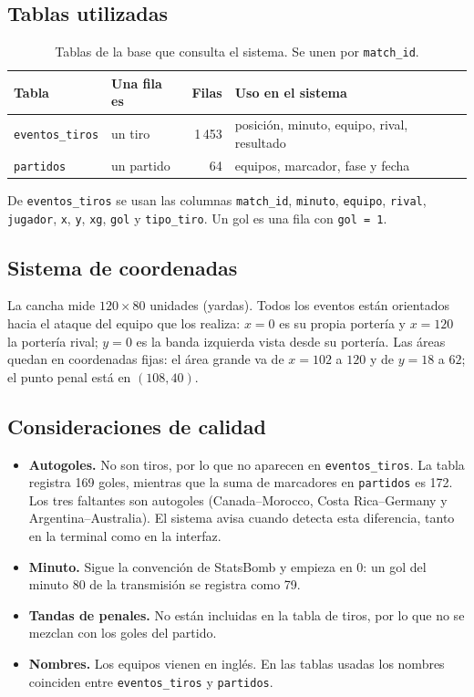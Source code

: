 \documentclass[11pt,a4paper]{article}
\begin{document}
\subsection{Tablas utilizadas}

\begin{table}[H]
\centering
\begin{tabular}{@{}llrl@{}}
\toprule
Tabla & Una fila es & Filas & Uso en el sistema \\
\midrule
\texttt{eventos\_tiros} & un tiro & 1\,453 & posición, minuto, equipo, rival, resultado \\
\texttt{partidos}       & un partido & 64 & equipos, marcador, fase y fecha \\
\bottomrule
\end{tabular}
\caption{Tablas de la base que consulta el sistema. Se unen por \texttt{match\_id}.}
\end{table}

De \texttt{eventos\_tiros} se usan las columnas \texttt{match\_id}, \texttt{minuto},
\texttt{equipo}, \texttt{rival}, \texttt{jugador}, \texttt{x}, \texttt{y}, \texttt{xg},
\texttt{gol} y \texttt{tipo\_tiro}. Un gol es una fila con \texttt{gol = 1}.

\subsection{Sistema de coordenadas}

La cancha mide $120 \times 80$ unidades (yardas). Todos los eventos están orientados
hacia el ataque del equipo que los realiza: $x = 0$ es su propia portería y
$x = 120$ la portería rival; $y = 0$ es la banda izquierda vista desde su portería.
Las áreas quedan en coordenadas fijas: el área grande va de $x = 102$ a $120$ y de
$y = 18$ a $62$; el punto penal está en $(108, 40)$.

\subsection{Consideraciones de calidad}

\begin{itemize}
  \item \textbf{Autogoles.} No son tiros, por lo que no aparecen en \texttt{eventos\_tiros}.
    La tabla registra 169 goles, mientras que la suma de marcadores en \texttt{partidos}
    es 172. Los tres faltantes son autogoles (Canada--Morocco, Costa Rica--Germany
    y Argentina--Australia). El sistema avisa cuando detecta esta diferencia, tanto en
    la terminal como en la interfaz.
  \item \textbf{Minuto.} Sigue la convención de StatsBomb y empieza en 0: un gol
    del minuto 80 de la transmisión se registra como 79.
  \item \textbf{Tandas de penales.} No están incluidas en la tabla de tiros, por lo
    que no se mezclan con los goles del partido.
  \item \textbf{Nombres.} Los equipos vienen en inglés. En las tablas usadas los
    nombres coinciden entre \texttt{eventos\_tiros} y \texttt{partidos}.
\end{itemize}
\end{document}
